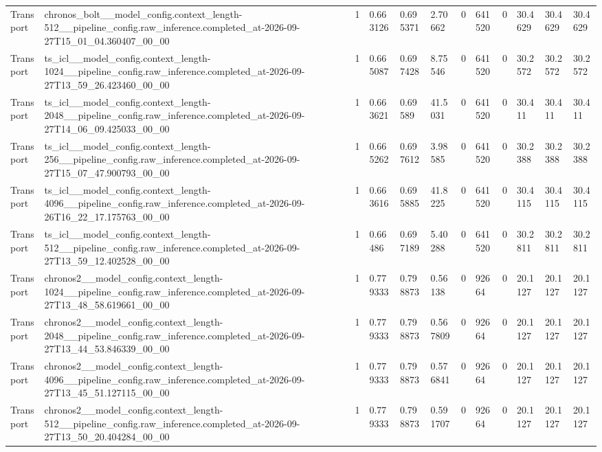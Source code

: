 \begin{tabular}{llllllllllll}
Transport & chronos\_bolt\_\_model\_config.context\_length-512\_\_pipeline\_config.raw\_inference.completed\_at-2026-09-27T15\_01\_04.360407\_00\_00 & 1 & 0.663126 & 0.695371 & 2.70662 & 0 & 641520 & 0 & 30.4629 & 30.4629 & 30.4629 \\
Transport & ts\_icl\_\_model\_config.context\_length-1024\_\_pipeline\_config.raw\_inference.completed\_at-2026-09-27T13\_59\_26.423460\_00\_00 & 1 & 0.665087 & 0.697428 & 8.75546 & 0 & 641520 & 0 & 30.2572 & 30.2572 & 30.2572 \\
Transport & ts\_icl\_\_model\_config.context\_length-2048\_\_pipeline\_config.raw\_inference.completed\_at-2026-09-27T14\_06\_09.425033\_00\_00 & 1 & 0.663621 & 0.69589 & 41.5031 & 0 & 641520 & 0 & 30.411 & 30.411 & 30.411 \\
Transport & ts\_icl\_\_model\_config.context\_length-256\_\_pipeline\_config.raw\_inference.completed\_at-2026-09-27T15\_07\_47.900793\_00\_00 & 1 & 0.665262 & 0.697612 & 3.98585 & 0 & 641520 & 0 & 30.2388 & 30.2388 & 30.2388 \\
Transport & ts\_icl\_\_model\_config.context\_length-4096\_\_pipeline\_config.raw\_inference.completed\_at-2026-09-26T16\_22\_17.175763\_00\_00 & 1 & 0.663616 & 0.695885 & 41.8225 & 0 & 641520 & 0 & 30.4115 & 30.4115 & 30.4115 \\
Transport & ts\_icl\_\_model\_config.context\_length-512\_\_pipeline\_config.raw\_inference.completed\_at-2026-09-27T13\_59\_12.402528\_00\_00 & 1 & 0.66486 & 0.697189 & 5.40288 & 0 & 641520 & 0 & 30.2811 & 30.2811 & 30.2811 \\
Transport & chronos2\_\_model\_config.context\_length-1024\_\_pipeline\_config.raw\_inference.completed\_at-2026-09-27T13\_48\_58.619661\_00\_00 & 1 & 0.779333 & 0.798873 & 0.56138 & 0 & 92664 & 0 & 20.1127 & 20.1127 & 20.1127 \\
Transport & chronos2\_\_model\_config.context\_length-2048\_\_pipeline\_config.raw\_inference.completed\_at-2026-09-27T13\_44\_53.846339\_00\_00 & 1 & 0.779333 & 0.798873 & 0.567809 & 0 & 92664 & 0 & 20.1127 & 20.1127 & 20.1127 \\
Transport & chronos2\_\_model\_config.context\_length-4096\_\_pipeline\_config.raw\_inference.completed\_at-2026-09-27T13\_45\_51.127115\_00\_00 & 1 & 0.779333 & 0.798873 & 0.576841 & 0 & 92664 & 0 & 20.1127 & 20.1127 & 20.1127 \\
Transport & chronos2\_\_model\_config.context\_length-512\_\_pipeline\_config.raw\_inference.completed\_at-2026-09-27T13\_50\_20.404284\_00\_00 & 1 & 0.779333 & 0.798873 & 0.591707 & 0 & 92664 & 0 & 20.1127 & 20.1127 & 20.1127 \\

\end{tabular}
